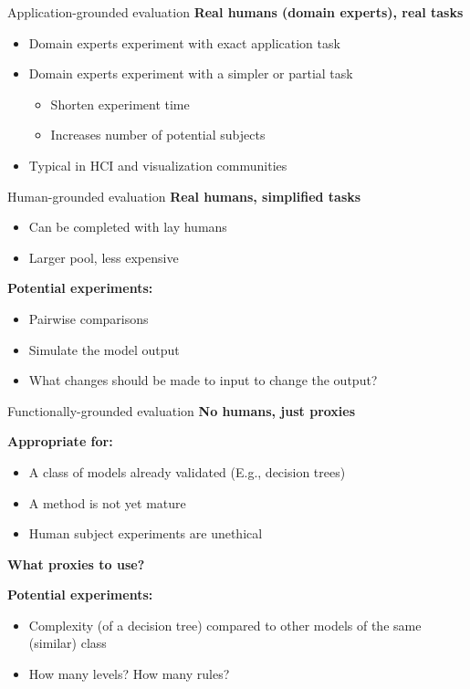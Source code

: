 \documentclass[10pt,aspectratio=169]{beamer}
\begin{document}
\begin{frame}{Application-grounded evaluation}
\textbf{Real humans (domain experts), real tasks}
\begin{itemize}
\item Domain experts experiment with exact application task
\item Domain experts experiment with a simpler or partial task
\begin{itemize}
\item Shorten experiment time
\item Increases number of potential subjects
\end{itemize}
\item Typical in HCI and visualization communities
\end{itemize}
\end{frame}

\begin{frame}{Human-grounded evaluation}
\textbf{Real humans, simplified tasks}
\begin{itemize}
\item Can be completed with lay humans
\item Larger pool, less expensive
\end{itemize}

\textbf{Potential experiments:}
\begin{itemize}
\item Pairwise comparisons
\item Simulate the model output
\item What changes should be made to input to change the output?
\end{itemize}
\end{frame}

\begin{frame}{Functionally-grounded evaluation}
\textbf{No humans, just proxies}

\textbf{Appropriate for:}
\begin{itemize}
\item A class of models already validated (E.g., decision trees)
\item A method is not yet mature
\item Human subject experiments are unethical
\end{itemize}

\textbf{What proxies to use?}

\textbf{Potential experiments:}
\begin{itemize}
\item Complexity (of a decision tree) compared to other models of the same (similar) class
\item How many levels? How many rules?
\end{itemize}
\end{frame}
\end{document}
